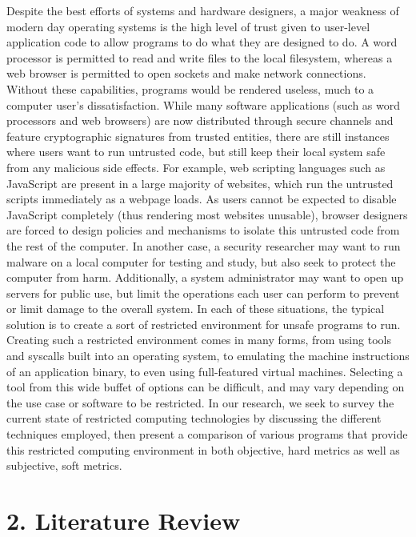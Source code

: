 \documentclass{proc}
\begin{document}
Despite the best efforts of systems and hardware designers, a major weakness of modern day operating systems is the high level of trust given to user-level application code to allow programs to do what they are designed to do. A word processor is permitted to read and write files to the local filesystem, whereas a web browser is permitted to open sockets and make network connections. Without these capabilities, programs would be rendered useless, much to a computer user's dissatisfaction.
\newline\newline
While many software applications (such as word processors and web browsers) are now distributed through secure channels and feature cryptographic signatures from trusted entities, there are still instances where users want to run untrusted code, but still keep their local system safe from any malicious side effects. For example, web scripting languages such as JavaScript are present in a large majority of websites, which run the untrusted scripts immediately as a webpage loads. As users cannot be expected to disable JavaScript completely (thus rendering most websites unusable), browser designers are forced to design policies and mechanisms to isolate this untrusted code from the rest of the computer. In another case, a security researcher may want to run malware on a local computer for testing and study, but also seek to protect the computer from harm. Additionally, a system administrator may want to open up servers for public use, but limit the operations each user can perform to prevent or limit damage to the overall system.
\newline\newline
In each of these situations, the typical solution is to create a sort of restricted environment for unsafe programs to run. Creating such a restricted environment comes in many forms, from using tools and syscalls built into an operating system, to emulating the machine instructions of an application binary, to even using full-featured virtual machines. Selecting a tool from this wide buffet of options can be difficult, and may vary depending on the use case or software to be restricted. In our research, we seek to survey the current state of restricted computing technologies by discussing the different techniques employed, then present a comparison of various programs that provide this restricted computing environment in both objective, hard metrics as well as subjective, soft metrics.

\section*{2. Literature Review}
\end{document}
